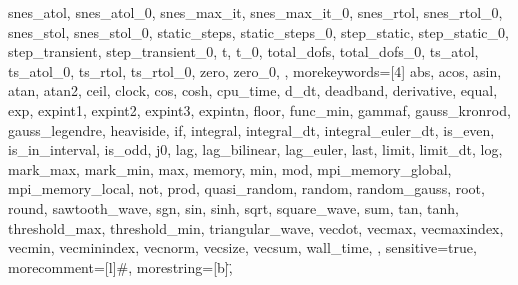 {{      snes_atol,
      snes_atol_0,
      snes_max_it,
      snes_max_it_0,
      snes_rtol,
      snes_rtol_0,
      snes_stol,
      snes_stol_0,
      static_steps,
      static_steps_0,
      step_static,
      step_static_0,
      step_transient,
      step_transient_0,
      t,
      t_0,
      total_dofs,
      total_dofs_0,
      ts_atol,
      ts_atol_0,
      ts_rtol,
      ts_rtol_0,
      zero,
      zero_0,
},
morekeywords={[4]
      abs,
      acos,
      asin,
      atan,
      atan2,
      ceil,
      clock,
      cos,
      cosh,
      cpu_time,
      d_dt,
      deadband,
      derivative,
      equal,
      exp,
      expint1,
      expint2,
      expint3,
      expintn,
      floor,
      func_min,
      gammaf,
      gauss_kronrod,
      gauss_legendre,
      heaviside,
      if,
      integral,
      integral_dt,
      integral_euler_dt,
      is_even,
      is_in_interval,
      is_odd,
      j0,
      lag,
      lag_bilinear,
      lag_euler,
      last,
      limit,
      limit_dt,
      log,
      mark_max,
      mark_min,
      max,
      memory,
      min,
      mod,
      mpi_memory_global,
      mpi_memory_local,
      not,
      prod,
      quasi_random,
      random,
      random_gauss,
      root,
      round,
      sawtooth_wave,
      sgn,
      sin,
      sinh,
      sqrt,
      square_wave,
      sum,
      tan,
      tanh,
      threshold_max,
      threshold_min,
      triangular_wave,
      vecdot,
      vecmax,
      vecmaxindex,
      vecmin,
      vecminindex,
      vecnorm,
      vecsize,
      vecsum,
      wall_time,
},
sensitive=true,
morecomment=[l]{\#},
morestring=[b]\",
}
